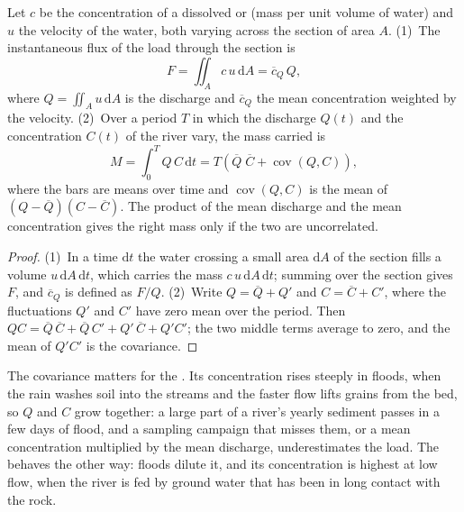 \begin{proposition}\label{prop:b1:erosion-transport:flux}
Let $c$ be the concentration of a dissolved or  (mass per unit
volume of water) and $u$ the velocity of the water, both varying across the
section of area $A$. (1)~The instantaneous flux of the load through the
section is
\[
  F = \iint_A c\,u\,\mathrm dA = \overline{c}_Q\,Q,
\]
where $Q = \iint_A u\,\mathrm dA$ is the discharge and $\overline{c}_Q$ the
mean concentration weighted by the velocity. (2)~Over a period $T$ in which the
discharge $Q(t)$ and the concentration $C(t)$ of the river vary, the mass
carried is
\[
  M = \int_0^T Q\,C\,\mathrm dt = T\left(\overline{Q}\;\overline{C} +
  \operatorname{cov}(Q, C)\right),
\]
where the bars are means over time and $\operatorname{cov}(Q, C)$ is the mean
of $(Q - \overline{Q})(C - \overline{C})$. The product of the mean discharge
and the mean concentration gives the right mass only if the two are
uncorrelated.
\end{proposition}

\begin{proof}
(1)~In a time $\mathrm dt$ the water crossing a small area $\mathrm dA$ of the
section fills a volume $u\,\mathrm dA\,\mathrm dt$, which carries the mass
$c\,u\,\mathrm dA\,\mathrm dt$; summing over the section gives $F$, and
$\overline{c}_Q$ is defined as $F/Q$. (2)~Write $Q = \overline{Q} + Q'$ and $C =
\overline{C} + C'$, where the fluctuations $Q'$ and $C'$ have zero mean over the
period. Then $QC = \overline{Q}\,\overline{C} + \overline{Q}\,C' + Q'\,\overline{C}
+ Q'C'$; the two middle terms average to zero, and the mean of $Q'C'$ is the
covariance.
\end{proof}

The covariance matters for the . Its concentration rises steeply
in floods, when the rain washes soil into the streams and the faster flow lifts
grains from the bed, so $Q$ and $C$ grow together: a large part of a river's
yearly sediment passes in a few days of flood, and a sampling campaign that
misses them, or a mean concentration multiplied by the mean discharge,
underestimates the load. The  behaves the other way: floods
dilute it, and its concentration is highest at low flow, when the river is fed
by ground water that has been in long contact with the rock.

